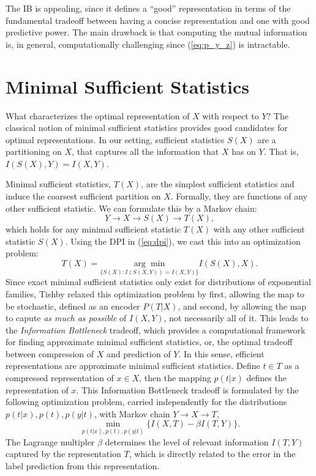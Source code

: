 \documentclass[11pt]{article}
\begin{document}
The IB is appealing, since it defines a ``good'' representation in terms of the fundamental tradeoff between having a concise representation and one with good predictive power. The main drawback is that computing the mutual information is, in general, computationally challenging since (\ref{eq:p_y_z}) is intractable.

\section{Minimal Sufficient Statistics}

What characterizes the optimal representation of $X$ with respect to $Y$? The classical notion of minimal sufficient statistics provides good candidates for optimal representations. In our setting, sufficient statistics $S(X)$ are a partitioning on $X$, that captures all the information that $X$ has on $Y$. That is, $I(S(X), Y) = I(X,Y)$.

Minimal sufficient statistics, $T(X)$, are the simplest sufficient statistics and induce the coarsest sufficient partition on $X$. Formally, they are functions of any other sufficient statistic. We can formulate this by a Markov chain:
\begin{equation}
Y\rightarrow X\rightarrow S(X) \rightarrow T(X),
\end{equation}
which holds for any minimal sufficient statistic $T(X)$ with any other sufficient statistic $S(X)$. Using the DPI in (\ref{eq:dpi}), we cast this into an optimization problem:
\begin{equation}
T(X) = \underset{\{S(X):I(S(X,Y))=I(X,Y)\}}{\arg\min} I(S(X), X).
\end{equation}
Since exact minimal sufficient statistics only exist for distributions of exponential families, Tishby relaxed this optimization problem by first, allowing the map to be stochastic, defined as an encoder $P(T\vert X)$, and second, by allowing the map to capute \textit{as much as possible} of $I(X,Y)$, not necessarily all of it.
This leads to the \textit{Information Bottleneck} tradeoff, which provides a computational framework for finding approximate minimal sufficient statistics, or, the optimal tradeoff between compression of $X$ and prediction of $Y$. In this sense, efficient representations are approximate minimal sufficient statistics.
Define $t\in T$ as a compressed representation of $x\in X$, then the mapping $p(t\vert x)$ defines the representation of $x$. This Information Bottleneck tradeoff is formulated by the following optimization problem, carried independently for the distributions $p(t\vert x), p(t), p(y\vert t)$, with Markov chain $Y\rightarrow X \rightarrow T$,
\begin{equation}
\underset{p(t\vert x), p(t), p(y\vert t)}{\min} \{ I(X,T)-\beta I(T,Y) \}.
\end{equation}
The Lagrange multipler $\beta$ determines the level of relevant information $I(T,Y)$ captured by the representation $T$, which is directly related to the error in the label prediction from this representation.
\end{document}
